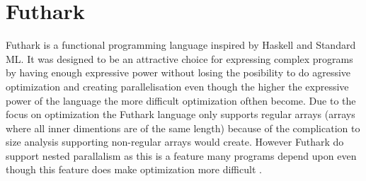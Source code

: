 \documentclass[11pt]{article}
\begin{document}




 


\section{Futhark}

Futhark is a functional programming language inspired by Haskell and Standard ML.
It was designed to be an attractive choice for expressing complex programs by having enough expressive power without
losing the posibility to do agressive optimization and creating parallelisation even though the higher the expressive power of the
language the more difficult optimization ofthen become.
Due to the focus on optimization the Futhark language only supports regular arrays
(arrays where all inner dimentions are of the same length)
because of the complication to size analysis supporting non-regular arrays would create.
However Futhark do support nested parallalism as this is a feature many programs 
depend upon even though this feature does make optimization more difficult \cite{TroelsHenriksen}.

\end{document}

